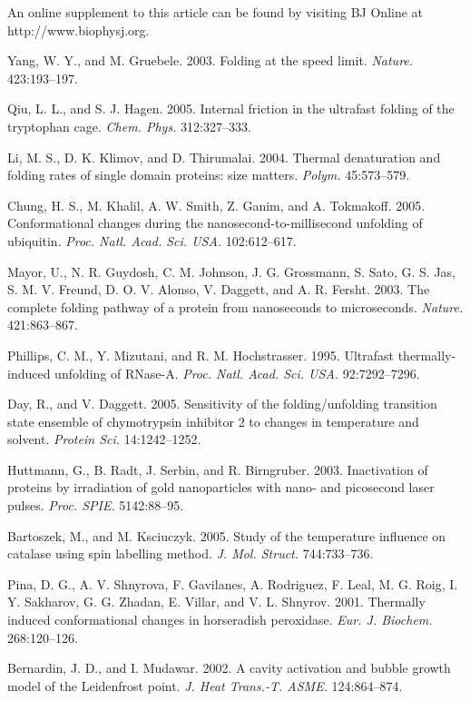 \documentclass{biophys}
\begin{document}
An online supplement to this article can be found by visiting BJ Online at http://www.biophysj.org.

\begin{thebibliography}{99}
Yang, W. Y., and M. Gruebele. 2003. Folding at the speed limit. {\it Nature.} 423:193--197.

Qiu, L. L., and S. J. Hagen. 2005. Internal friction in the ultrafast folding of the tryptophan cage. {\it Chem. Phys.} 312:327--333.

Li, M. S., D. K. Klimov, and D. Thirumalai. 2004. Thermal denaturation and folding rates of single domain proteins: size matters. {\it Polym.} 45:573--579.

Chung, H. S., M. Khalil, A. W. Smith, Z. Ganim, and A. Tokmakoff. 2005. Conformational changes during the nanosecond-to-millisecond unfolding of ubiquitin.
{\it Proc. Natl. Acad. Sci. USA.} 102:612--617.

Mayor, U., N. R. Guydosh, C. M. Johnson, J. G. Grossmann, S. Sato, G. S. Jas, S. M. V. Freund, D. O. V. Alonso, V. Daggett, and A. R. Fersht. 2003. The complete folding pathway of a protein from nanoseconds to microseconds. {\it Nature.} 421:863--867.

Phillips, C. M., Y. Mizutani, and R. M. Hochstrasser. 1995. Ultrafast thermally-induced unfolding of RNase-A. {\it Proc. Natl. Acad. Sci. USA.} 92:7292--7296.

Day, R., and V. Daggett. 2005. Sensitivity of the folding/unfolding transition state ensemble of chymotrypsin inhibitor 2 to changes in temperature and solvent. {\it Protein Sci.} 14:1242--1252.

Huttmann, G., B. Radt, J. Serbin, and R. Birngruber. 2003. Inactivation of proteins by irradiation of gold nanoparticles with nano- and picosecond laser pulses. {\it Proc. SPIE.} 5142:88--95.

Bartoszek, M., and M. Ksciuczyk. 2005. Study of the temperature influence on catalase using spin labelling method. {\it J. Mol. Struct.} 744:733--736.

Pina, D. G., A. V. Shnyrova, F. Gavilanes, A. Rodriguez, F. Leal, M. G. Roig, I. Y. Sakharov, G. G. Zhadan, E. Villar, and V. L. Shnyrov. 2001. Thermally induced conformational changes in horseradish peroxidase. {\it Eur. J. Biochem.} 268:120--126.

Bernardin, J. D., and I. Mudawar. 2002. A cavity activation and bubble growth model of the Leidenfrost point. {\it J. Heat Trans.-T. ASME.} 124:864--874.


\end{thebibliography}
\end{document}
